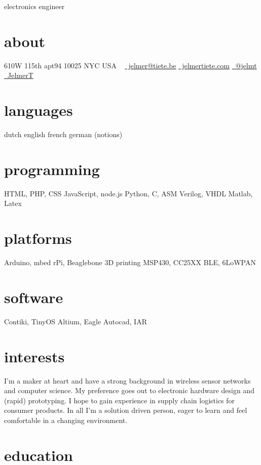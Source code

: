 \documentclass[]{friggeri-cv}
\begin{document}
       {electronics engineer}


\begin{aside}
  \section{about}
    610W 115th apt94
    10025 NYC
    USA
    ~
    \href{mailto:jelmer@tiete.be}{\textcolor{textcolor}{\faEnvelopeAlt}~jelmer@tiete.be}
    \href{http://jelmertiete.com}{\textcolor{textcolor}{\faGlobe}~jelmertiete.com}
    \href{http://twitter.com/jelmt}{\textcolor{textcolor}{\faTwitter}~@jelmt}
    \href{https://github.com/JelmerT}{\textcolor{textcolor}{\faGithub}~JelmerT}
  \section{languages}
    dutch
    english
    french
    german (notions)
  \section{programming}
    HTML, PHP, CSS
    JavaScript, node.js
    Python, C, ASM
    Verilog, VHDL
    Matlab, Latex
  \section{platforms}
    Arduino, mbed
    rPi, Beaglebone
    3D printing
    MSP430, CC25XX
    BLE, 6LoWPAN
  \section{software}
    Contiki, TinyOS
    Altium, Eagle
    Autocad, IAR
\end{aside}

\section{interests}
I'm a maker at heart and have a strong background in wireless sensor networks and computer science. My preference goes out to electronic hardware design and (rapid) prototyping. I hope to gain experience in supply chain logistics for consumer products. In all I'm a solution driven person, eager to learn and feel comfortable in a changing environment.

\section{education}
\end{document}

